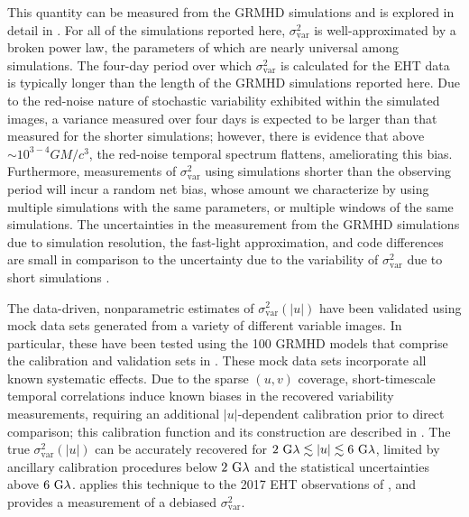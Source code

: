 This quantity can be measured from the GRMHD simulations and is explored in detail in \citet{Georgiev_2022}. For all of the simulations reported here, $\sigma_\text{var}^2$ is well-approximated by a broken power law, the parameters of which are nearly universal among simulations.
The four-day period over which $\sigma_\text{var}^2$ is calculated for the EHT data is typically longer than the length of the GRMHD simulations reported here. Due to the red-noise nature of stochastic variability exhibited within the simulated images, a variance measured over four days is expected to be larger than that measured for the shorter simulations; however, there is evidence that above $\sim 10^{3-4} GM/c^3$, the red-noise temporal spectrum flattens, ameliorating this bias.
Furthermore, measurements of $\sigma_\text{var}^2$ using simulations shorter than the observing period will incur a random net bias, whose amount we characterize by using multiple simulations with the same parameters, or multiple windows of the same simulations.
The uncertainties in the measurement from the GRMHD simulations due to simulation resolution, the fast-light approximation, and code differences are small in comparison to the uncertainty due to the variability of $\sigma_\text{var}^2$ due to short simulations \citep{Georgiev_2022}.

The data-driven, nonparametric estimates of $\sigma_\text{var}^2 (|u|)$ have been validated using mock data sets generated from a variety of different variable images.  In particular, these have been tested using the 100 GRMHD models that comprise the calibration and validation sets in .  These mock data sets incorporate all known systematic effects.  Due to the sparse $(u,v)$ coverage, short-timescale temporal correlations induce known biases in the recovered variability measurements, requiring an additional $|u|$-dependent calibration prior to direct comparison; this calibration function and its construction are described in \citealt{NoiseModeling}.  The true $\sigma_\text{var}^2 (|u|)$ can be accurately recovered for $2~{\rm G}\lambda\lesssim|u|\lesssim6~{\rm G}\lambda$, limited by ancillary calibration procedures below $2~{\rm G}\lambda$ and the statistical uncertainties above $6~{\rm G}\lambda$.   applies this technique to the 2017 EHT observations of \sgra, and provides a measurement of a debiased $\sigma_\text{var}^2$.


